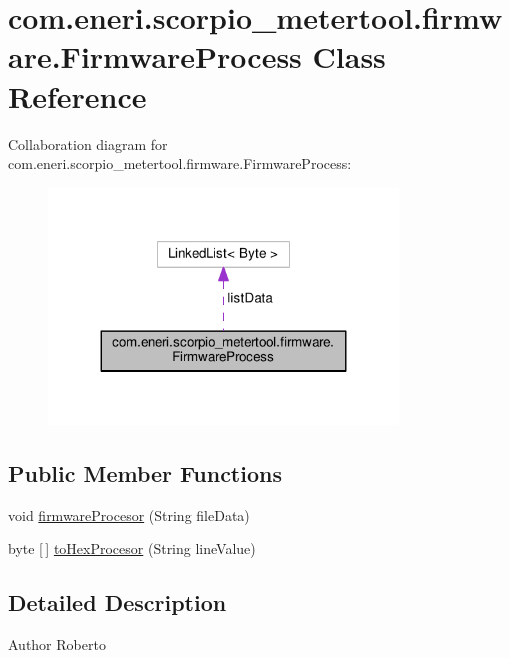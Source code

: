 \hypertarget{classcom_1_1eneri_1_1scorpio__metertool_1_1firmware_1_1_firmware_process}{}\section{com.\+eneri.\+scorpio\+\_\+metertool.\+firmware.\+Firmware\+Process Class Reference}
\label{classcom_1_1eneri_1_1scorpio__metertool_1_1firmware_1_1_firmware_process}


Collaboration diagram for com.\+eneri.\+scorpio\+\_\+metertool.\+firmware.\+Firmware\+Process\+:
\nopagebreak
\begin{figure}[H]
\begin{center}
\leavevmode
\includegraphics[width=263pt]{classcom_1_1eneri_1_1scorpio__metertool_1_1firmware_1_1_firmware_process__coll__graph}
\end{center}
\end{figure}
\subsection*{Public Member Functions}
\begin{DoxyCompactItemize}
\item 
void \hyperlink{classcom_1_1eneri_1_1scorpio__metertool_1_1firmware_1_1_firmware_process_aad1b71eb3398370cff7c937f290cda21}{firmware\+Procesor} (String file\+Data)
\item 
byte \mbox{[}$\,$\mbox{]} \hyperlink{classcom_1_1eneri_1_1scorpio__metertool_1_1firmware_1_1_firmware_process_a8ea0da8d77282e4c7c722e7cbc9206d3}{to\+Hex\+Procesor} (String line\+Value)
\end{DoxyCompactItemize}


\subsection{Detailed Description}
\begin{DoxyAuthor}{Author}
Roberto 
\end{DoxyAuthor}


